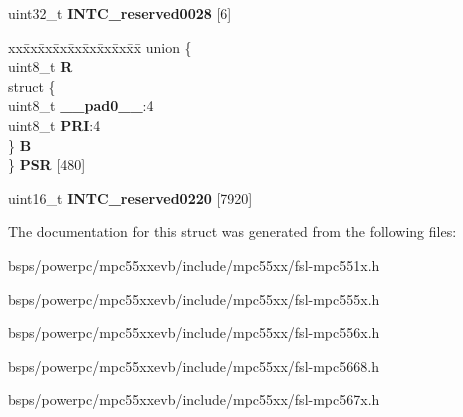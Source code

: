 \begin{DoxyCompactItemize}
\begin{tabbing}
\end{tabbing}\item 
\mbox{\label{structINTC__tag_a3e36917eb595e18a24ff56c59ea0561f}} 
uint32\+\_\+t {\bfseries I\+N\+T\+C\+\_\+reserved0028} \mbox{[}6\mbox{]}
\item 
\mbox{\label{structINTC__tag_a9efcaaacb0068fbefc5e549c546091e1}} 
\begin{tabbing}
xx\=xx\=xx\=xx\=xx\=xx\=xx\=xx\=xx\=\kill
union \{\\
\>uint8\_t {\bfseries R}\\
\>struct \{\\
\>\>uint8\_t {\bfseries \_\_pad0\_\_}:4\\
\>\>uint8\_t {\bfseries PRI}:4\\
\>\} {\bfseries B}\\
\} {\bfseries PSR} \mbox{[}480\mbox{]}\\

\end{tabbing}\item 
\mbox{\label{structINTC__tag_a7f81519948f8debb50192714893d2588}} 
uint16\+\_\+t {\bfseries I\+N\+T\+C\+\_\+reserved0220} \mbox{[}7920\mbox{]}
\end{DoxyCompactItemize}


The documentation for this struct was generated from the following files\+:\begin{DoxyCompactItemize}
\item 
bsps/powerpc/mpc55xxevb/include/mpc55xx/fsl-\/mpc551x.\+h\item 
bsps/powerpc/mpc55xxevb/include/mpc55xx/fsl-\/mpc555x.\+h\item 
bsps/powerpc/mpc55xxevb/include/mpc55xx/fsl-\/mpc556x.\+h\item 
bsps/powerpc/mpc55xxevb/include/mpc55xx/fsl-\/mpc5668.\+h\item 
bsps/powerpc/mpc55xxevb/include/mpc55xx/fsl-\/mpc567x.\+h\end{DoxyCompactItemize}
